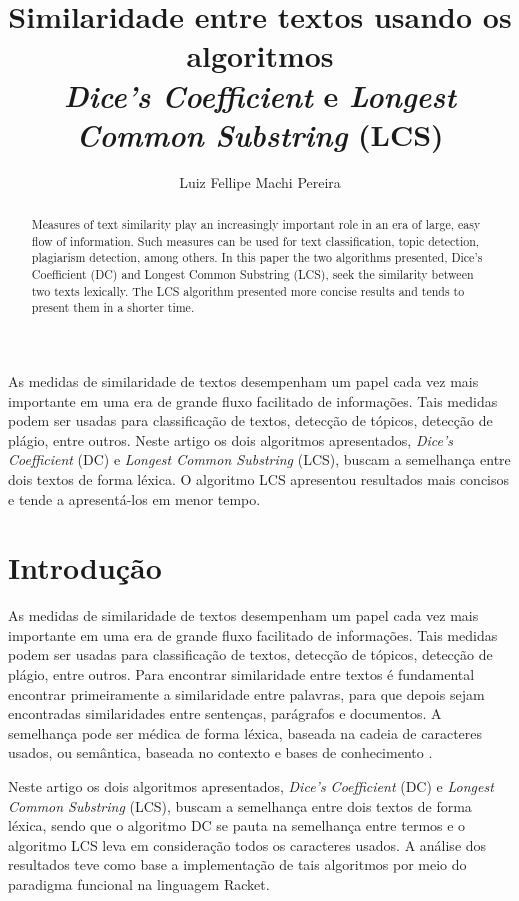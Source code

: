 \documentclass[12pt]{article}
\title{Similaridade entre textos usando os algoritmos\\ \textit{Dice's Coefficient} e \textit{Longest Common Substring} (LCS)}
\author{Luiz Fellipe Machi Pereira\inst{1}}
\begin{document}
 

\maketitle

\begin{abstract}
Measures of text similarity play an increasingly important role in an era of large, easy flow of information. Such measures can be used for text classification, topic detection, plagiarism detection, among others. In this paper the two algorithms presented, Dice's Coefficient (DC) and Longest Common Substring (LCS), seek the similarity between two texts lexically. The LCS algorithm presented more concise results and tends to present them in a shorter time.
\end{abstract}

\begin{resumo} 
As medidas de similaridade de textos desempenham um papel cada vez mais importante em uma era de grande fluxo facilitado de informações. Tais medidas podem ser usadas para classificação de textos, detecção de tópicos, detecção de plágio, entre outros. Neste artigo os dois algoritmos apresentados, \textit{Dice's Coefficient} (DC) e \textit{Longest Common Substring} (LCS), buscam a semelhança entre dois textos de forma léxica. O algoritmo LCS apresentou resultados mais concisos e tende a apresentá-los em menor tempo.
\end{resumo}

\section{Introdução}

As medidas de similaridade de textos desempenham um papel cada vez mais importante em uma era de grande fluxo facilitado de informações. Tais medidas podem ser usadas para classificação de textos, detecção de tópicos, detecção de plágio, entre outros. Para encontrar similaridade entre textos é fundamental encontrar primeiramente a similaridade entre palavras, para que depois sejam encontradas similaridades entre sentenças, parágrafos e documentos. A semelhança pode ser médica de forma léxica, baseada na cadeia de caracteres usados, ou semântica, baseada no contexto e bases de conhecimento \cite{textsimilarityapproaches}.

Neste artigo os dois algoritmos apresentados, \textit{Dice's Coefficient} (DC) e \textit{Longest Common Substring} (LCS), buscam a semelhança entre dois textos de forma léxica, sendo que o algoritmo DC se pauta na semelhança entre termos e o algoritmo LCS leva em consideração todos os caracteres usados. A análise dos resultados teve como base a implementação de tais algoritmos por meio do paradigma funcional na linguagem Racket.
\end{document}
